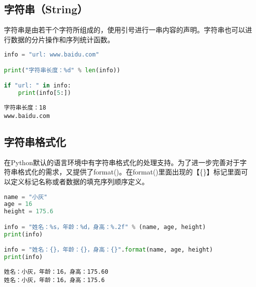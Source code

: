 \subsection{字符串（String）}

字符串是由若干个字符所组成的，使用引号进行一串内容的声明。字符串也可以进行数据的分片操作和序列统计函数。\\


\begin{lstlisting}[language=Python]
info = "url: www.baidu.com"

print("字符串长度：%d" % len(info))

if "url: " in info:
    print(info[5:])
\end{lstlisting}

\begin{tcolorbox}
	\begin{verbatim}
字符串长度：18
www.baidu.com
\end{verbatim}
\end{tcolorbox}

\vspace{0.5cm}

\subsection{字符串格式化}

在Python默认的语言环境中有字符串格式化的处理支持。为了进一步完善对于字符串格式化的需求，又提供了format()。在format()里面出现的【\{\}】标记里面可以定义标记名称或者数据的填充序列顺序定义。\\


\begin{lstlisting}[language=Python]
name = "小灰"
age = 16
height = 175.6

info = "姓名：%s，年龄：%d，身高：%.2f" % (name, age, height)
print(info)

info = "姓名：{}，年龄：{}，身高：{}".format(name, age, height)
print(info)
\end{lstlisting}

\begin{tcolorbox}
	\begin{verbatim}
姓名：小灰，年龄：16，身高：175.60
姓名：小灰，年龄：16，身高：175.6
\end{verbatim}
\end{tcolorbox}

